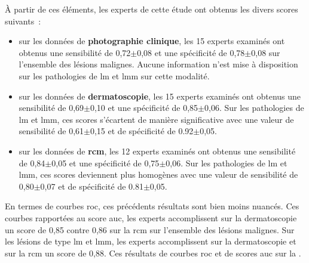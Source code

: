 À partir de ces éléments, les experts de cette étude ont obtenus les divers scores suivants~:
\begin{itemize}
    \item sur les données de \textbf{photographie clinique}, les 15 experts examinés ont obtenus une sensibilité de 0,72$\pm$0,08 et une spécificité de 0,78$\pm$0,08 sur l'ensemble des lésions malignes. Aucune information n'est mise à disposition sur les pathologies de \gls{lm} et \gls{lmm} sur cette modalité.
    \item sur les données de \textbf{dermatoscopie}, les 15 experts examinés ont obtenus une sensibilité de 0,69$\pm$0,10 et une spécificité de 0,85$\pm$0,06. Sur les pathologies de \gls{lm} et \gls{lmm}, ces scores s'écartent de manière significative avec une valeur de sensibilité de 0,61$\pm$0,15 et de spécificité de 0.92$\pm$0,05.
    \item sur les données de \textbf{\gls{rcm}}, les 12 experts examinés ont obtenus une sensibilité de 0,84$\pm$0,05 et une spécificité de 0,75$\pm$0,06. Sur les pathologies de \gls{lm} et \gls{lmm}, ces scores deviennent plus homogènes avec une valeur de sensibilité de 0,80$\pm$0,07 et de spécificité de 0.81$\pm$0,05.
\end{itemize}\par

En termes de courbes \gls{roc}, ces précédents résultats sont bien moins nuancés. Ces courbes rapportées au score \gls{auc}, les experts accomplissent sur la dermatoscopie un score de 0,85 contre 0,86 sur la \gls{rcm} sur l'ensemble des lésions malignes. Sur les lésions de type \gls{lm} et \gls{lmm}, les experts accomplissent sur la dermatoscopie et sur la \gls{rcm} un score de 0,88. Ces résultats de courbes \gls{roc} et de scores \gls{auc} sur la .\par


